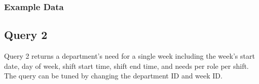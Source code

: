 \documentclass[letter,12pt]{texMemo}
\begin{document}
\subsubsection*{Example Data}

\begin{changemargin}{-1.25cm}{-1.25cm}
	\begin{center}
		
	\end{center}
\end{changemargin}


\subsection*{Query 2}
Query 2 returns a department's need for a single week including the week's start date, day of week, shift start time, shift end time, and needs per role per shift. The query can be tuned by changing the department ID and week ID.
\end{document}
